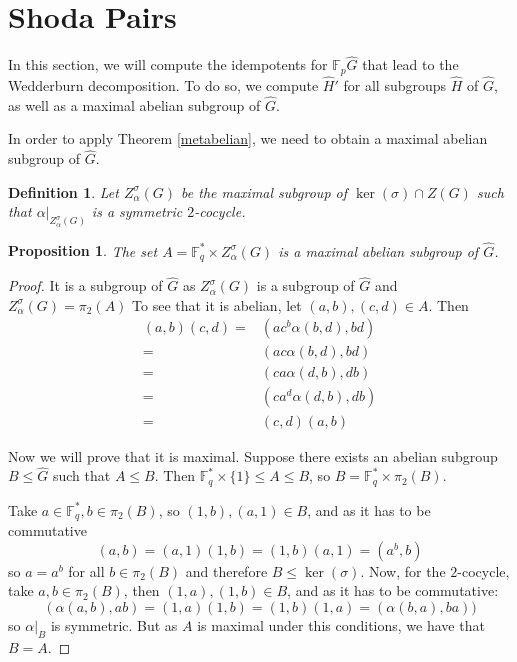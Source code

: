 \documentclass{article}
\newtheorem{proposition}[theorem]{Proposition}
\newtheorem{definition}{Definition}
\begin{document}
\section{Shoda Pairs}
In this section, we will compute the idempotents for $\mathbb{F}_p \hat{G}$ that lead to the Wedderburn decomposition. To do so, we compute $\hat{H}'$ for all subgroups $\hat{H}$ of $\hat{G}$, as well as a maximal abelian subgroup of $\hat{G}$.


In order to apply Theorem \ref{metabelian}, we need to obtain a maximal abelian subgroup of $\hat{G}$.
\begin{definition}
    Let $Z_\alpha^\sigma(G)$ be the maximal subgroup of $\ker(\sigma) \cap Z(G)$ such that $\alpha|_{Z_\alpha^\sigma(G)}$ is a symmetric $2$-cocycle.
\end{definition}

\begin{proposition}
    The set $A=\mathbb{F}_q^* \times Z_\alpha^\sigma(G)$ is a maximal abelian subgroup of $\hat{G}$.
\end{proposition}
\begin{proof}
    It is a subgroup of $\hat{G}$ as $Z_\alpha^\sigma(G)$ is a subgroup of $\hat{G}$ and $Z_\alpha^\sigma(G) = \pi_2(A)$ To see that it is abelian, let $(a,b),(c,d)\in  A$. Then
    \begin{align*}
        (a,b)(c,d) = & (ac^b \alpha(b,d),bd) \\ = & (ac \alpha(b,d),bd) \\ = & (ca\alpha(d,b),db) \\ = & (ca^d \alpha(d,b), db) \\ = & (c,d) (a,b)
    \end{align*}

    Now we will prove that it is maximal. Suppose there exists an abelian subgroup $B\leq \hat{G}$ such that $A\leq B$. Then $\mathbb{F}_q^* \times \{1\}\leq A \leq B$, so $B=\mathbb{F}_q^* \times \pi_2(B)$.
    
      Take $a\in \mathbb{F}_q^*, b \in \pi_2(B)$, so $(1,b),(a,1) \in B$, and as it has to be commutative
    \begin{equation}
        (a,b) = (a,1)(1,b) = (1,b)(a,1) =  (a^b,b)
    \end{equation}
    so $a=a^b$ for all $b\in \pi_2(B)$ and therefore $B\leq \ker(\sigma)$. Now, for the $2$-cocycle, take $a,b\in \pi_2(B)$, then $(1,a),(1,b) \in B$, and as it has to be commutative:
    \begin{equation}
        ( \alpha(a,b), ab) = (1,a)(1,b) = (1,b)(1,a) = (\alpha(b,a),ba)) 
    \end{equation}
    so $\alpha|_B$ is symmetric. But as $A$ is maximal under this conditions, we have that $B=A$. 
\end{proof}
\end{document}
